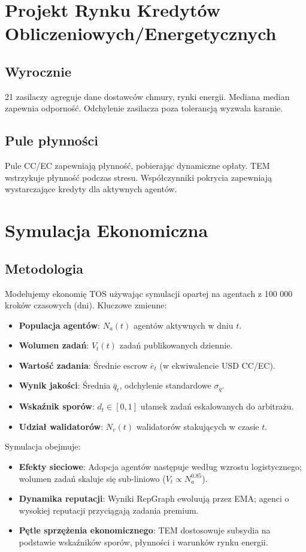 \documentclass[11pt]{article}
\begin{document}
\section{Projekt Rynku Kredytów Obliczeniowych/Energetycznych}
\subsection{Wyrocznie}
21 zasilaczy agreguje dane dostawców chmury, rynki energii. Mediana median zapewnia odporność. Odchylenie zasilacza poza tolerancją wyzwala karanie.

\subsection{Pule płynności}
Pule CC/EC zapewniają płynność, pobierając dynamiczne opłaty. TEM wstrzykuje płynność podczas stresu. Współczynniki pokrycia zapewniają wystarczające kredyty dla aktywnych agentów.

\section{Symulacja Ekonomiczna}
\label{sec:econ-sim}

\subsection{Metodologia}
Modelujemy ekonomię TOS używając symulacji opartej na agentach z 100 000 kroków czasowych (dni). Kluczowe zmienne:
\begin{itemize}[noitemsep]
  \item \textbf{Populacja agentów}: $N_a(t)$ agentów aktywnych w dniu $t$.
  \item \textbf{Wolumen zadań}: $V_t(t)$ zadań publikowanych dziennie.
  \item \textbf{Wartość zadania}: Średnie escrow $\bar{e}_t$ (w ekwiwalencie USD CC/EC).
  \item \textbf{Wynik jakości}: Średnia $\bar{q}_t$, odchylenie standardowe $\sigma_q$.
  \item \textbf{Wskaźnik sporów}: $d_t \in [0,1]$ ułamek zadań eskalowanych do arbitrażu.
  \item \textbf{Udział walidatorów}: $N_v(t)$ walidatorów stakujących w czasie $t$.
\end{itemize}
Symulacja obejmuje:
\begin{itemize}[noitemsep]
  \item \textbf{Efekty sieciowe}: Adopcja agentów następuje według wzrostu logistycznego; wolumen zadań skaluje się sub-liniowo ($V_t \propto N_a^{0.85}$).
  \item \textbf{Dynamika reputacji}: Wyniki RepGraph ewoluują przez EMA; agenci o wysokiej reputacji przyciągają zadania premium.
  \item \textbf{Pętle sprzężenia ekonomicznego}: TEM dostosowuje subsydia na podstawie wskaźników sporów, płynności i warunków rynku energii.
\end{itemize}
\end{document}
